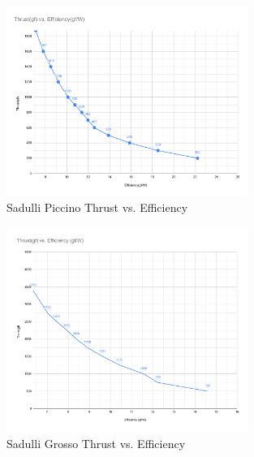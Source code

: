 \documentclass{document_templates/documentation_template_latex/zubaxdoc}
\begin{document}
\begin{figure}[!hbt]
	\centerline{\includegraphics[width=0.7\textwidth]{figures/thrust-efficiency_piccino.pdf}}
	\caption{Sadulli Piccino Thrust vs. Efficiency\label{Piccino_thrust_vs_efficiency}}
\end{figure}

\begin{figure}[!hbt]
	\centerline{\includegraphics[width=0.7\textwidth]{figures/thrust-efficiency_grosso.pdf}}
	\caption{Sadulli Grosso Thrust vs. Efficiency\label{Grosso_thrust_vs_efficiency}}
\end{figure}
\end{document}
